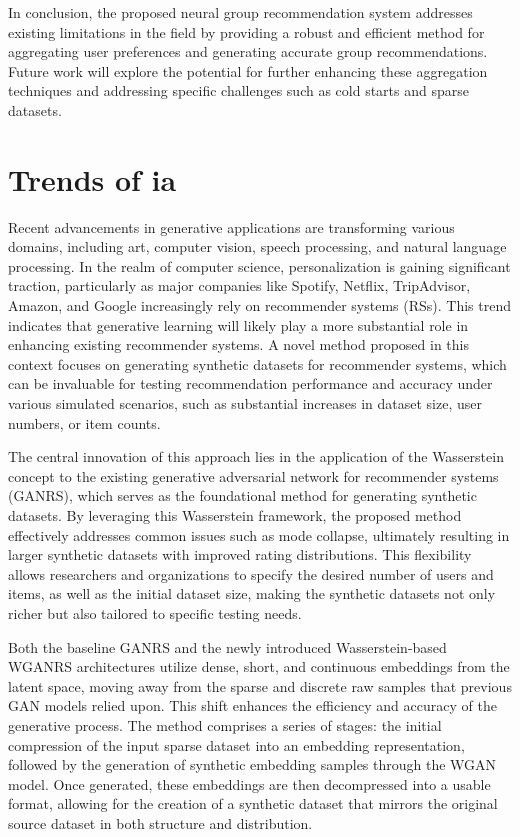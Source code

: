 \documentclass[runningheads]{llncs}
\begin{document}
In conclusion, the proposed neural group recommendation system addresses existing limitations in the field by providing a robust and efficient method for aggregating user preferences and generating accurate group recommendations. Future work will explore the potential for further enhancing these aggregation techniques and addressing specific challenges such as cold starts and sparse datasets.
\section{Trends of ia}
Recent advancements in generative applications are transforming various domains, including art, computer vision, speech processing, and natural language processing. In the realm of computer science, personalization is gaining significant traction, particularly as major companies like Spotify, Netflix, TripAdvisor, Amazon, and Google increasingly rely on recommender systems (RSs). This trend indicates that generative learning will likely play a more substantial role in enhancing existing recommender systems. A novel method proposed in this context focuses on generating synthetic datasets for recommender systems, which can be invaluable for testing recommendation performance and accuracy under various simulated scenarios, such as substantial increases in dataset size, user numbers, or item counts.

The central innovation of this approach lies in the application of the Wasserstein concept to the existing generative adversarial network for recommender systems (GANRS), which serves as the foundational method for generating synthetic datasets. By leveraging this Wasserstein framework, the proposed method effectively addresses common issues such as mode collapse, ultimately resulting in larger synthetic datasets with improved rating distributions. This flexibility allows researchers and organizations to specify the desired number of users and items, as well as the initial dataset size, making the synthetic datasets not only richer but also tailored to specific testing needs.

Both the baseline GANRS and the newly introduced Wasserstein-based WGANRS architectures utilize dense, short, and continuous embeddings from the latent space, moving away from the sparse and discrete raw samples that previous GAN models relied upon. This shift enhances the efficiency and accuracy of the generative process. The method comprises a series of stages: the initial compression of the input sparse dataset into an embedding representation, followed by the generation of synthetic embedding samples through the WGAN model. Once generated, these embeddings are then decompressed into a usable format, allowing for the creation of a synthetic dataset that mirrors the original source dataset in both structure and distribution.
\end{document}
